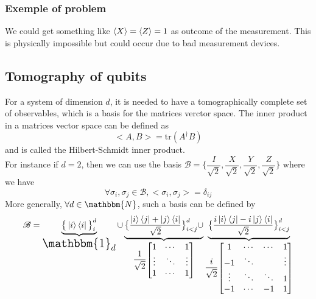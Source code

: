 \documentclass{article}
\begin{document}
\subsubsection*{Exemple of problem}
We could get something like $\braket{X}=\braket{Z}=1$ as outcome of the
measurement. This is physically impossible but could occur due to bad
measurement devices.

\subsection{Tomography of qubits}
For a system of dimension $d$, it is needed to have a tomographically complete
set of observables, which is a basis for the matrices verctor space. The inner
product in a matrices vector space can be defined as
\begin{equation}
    \label{def-h-s-inner-product}
    <A,B> = \text{tr}(A^\dagger B)
\end{equation}
and is called the Hilbert-Schmidt inner product.
\\
For instance if $d=2$, then we can use the basis $\mathscr{B}=\Big\{\dfrac{I}{\sqrt
2}, \dfrac{X}{\sqrt 2}, \dfrac{Y}{\sqrt 2}, \dfrac{Z}{\sqrt 2}\Big\}$ where we have
\begin{equation}
    \forall \sigma_i, \sigma_j \in \mathscr{B}, <\sigma_i, \sigma_j> = \delta_{ij}
\end{equation}
More generally, $\forall d \in \mathbbm{N}$, such a basis can be defined by
\begin{equation}
    \mathscr{B} =
        \underbrace{
            \big\{\ket{i}\bra{i}\big\}_i^d
        }_{
            \text{\Large$\mathbbm{1}_d$}
        } \cup
        \underbrace{
            \big\{\frac{\ket{i}\bra{j} + \ket{j}\bra{i}}{\sqrt 2}\big\}_{i<j}^d\cup
        }_{
            \dfrac{1}{\sqrt2}
            \begin{bmatrix}
                1 & \cdots & 1 \\
                \vdots & \ddots & \vdots \\
                1 & \cdots & 1
            \end{bmatrix}
        }
        \underbrace{
            \big\{\frac{i\ket{i}\bra{j} - i\ket{j}\bra{i}}{\sqrt 2}\big\}_{i<j}^d
        }_{
            \dfrac{i}{\sqrt2}
            \begin{bmatrix}
                1 & \cdots & \cdots & 1 \\
                -1 & \ddots & & \vdots \\
                \vdots & \ddots & \ddots & 1 \\
                -1 & \cdots & -1 & 1
            \end{bmatrix}
        }
\end{equation}
\end{document}
